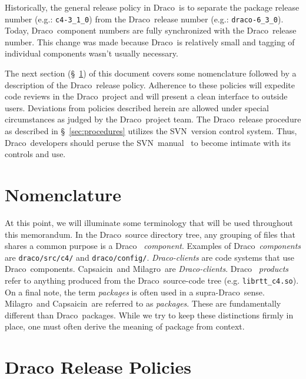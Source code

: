 \documentclass[note]{ResearchNote_pdf}
\newcommand{\draco}{{\normalfont\small\sffamily Draco}}
\newcommand{\milagro}{{\normalfont\small\sffamily Milagro}}
\newcommand{\capsaicin}{{\normalfont\small\sffamily Capsaicin}}
\newcommand{\svn}{\textsf{SVN}}
\begin{document}
Historically, the general release policy in \draco\ is to separate the
package release number (e.g.: \texttt{c4-3\_1\_0}) from the
\draco\ release number (e.g.: \texttt{draco-6\_3\_0}).  Today,
\draco\ component numbers are fully synchronized with the
\draco\ release number.  This change was made because \draco\ is
relatively small and tagging of individual components wasn't usually
necessary.

The next section (\S~\ref{sec:nomenclature}) of this document covers
some nomenclature followed by a description of the \draco\ release
policy.  Adherence to these policies will expedite code reviews in the
\draco\ project and will present a clean interface to outside users.
Deviations from policies described herein are allowed under special
circumstances as judged by the \draco\ project team.  The
\draco\ release procedure as described in \S~\ref{sec:procedures}
utilizes the \svn\ version control system.  Thus, \draco\ developers
should peruse the \svn\ manual~\cite{svn-redbean} to become intimate
with its controls and use.

\section{Nomenclature}
\label{sec:nomenclature}

At this point, we will illuminate some terminology that will be used
throughout this memorandum.  In the \draco\ source directory tree, any
grouping of files that shares a common purpose is a \draco\ {\it
  component}.  Examples of \draco\ {\it components} are
\texttt{draco/src/c4/} and \texttt{draco/config/}. {\it
  \draco-clients} are code systems that use \draco\ components.
\capsaicin\ and \milagro\ are {\it \draco-clients}.  \draco\ {\it
  products} refer to anything produced from the \draco\ source-code
tree (e.g. \texttt{librtt\_c4.so}).  On a final note, the term {\it
  packages} is often used in a supra-\draco\ sense.  \milagro\ and
\capsaicin\ are referred to as {\it packages}.  These are
fundamentally different than \draco\ packages.  While we try to keep
these distinctions firmly in place, one must often derive the meaning
of package from context.


 
\section{Draco Release Policies}
\label{sec:policy}
\end{document}
